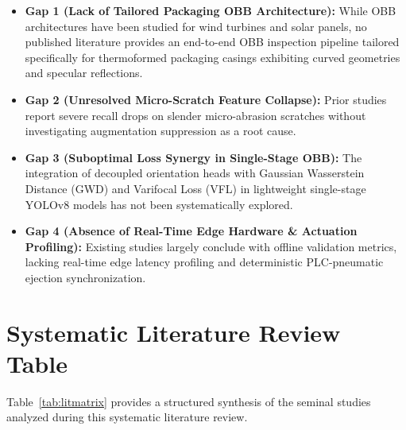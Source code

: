 \begin{itemize}
\item \textbf{Gap 1 (Lack of Tailored Packaging OBB Architecture):} While OBB architectures have been studied for wind turbines and solar panels, no published literature provides an end-to-end OBB inspection pipeline tailored specifically for thermoformed packaging casings exhibiting curved geometries and specular reflections.
\item \textbf{Gap 2 (Unresolved Micro-Scratch Feature Collapse):} Prior studies report severe recall drops on slender micro-abrasion scratches without investigating augmentation suppression as a root cause.
\item \textbf{Gap 3 (Suboptimal Loss Synergy in Single-Stage OBB):} The integration of decoupled orientation heads with Gaussian Wasserstein Distance (GWD) and Varifocal Loss (VFL) in lightweight single-stage YOLOv8 models has not been systematically explored.
\item \textbf{Gap 4 (Absence of Real-Time Edge Hardware \& Actuation Profiling):} Existing studies largely conclude with offline validation metrics, lacking real-time edge latency profiling and deterministic PLC-pneumatic ejection synchronization.
\end{itemize}

\section{Systematic Literature Review Table}
\label{sec:litmatrix}

Table~\ref{tab:litmatrix} provides a structured synthesis of the seminal studies analyzed during this systematic literature review.

